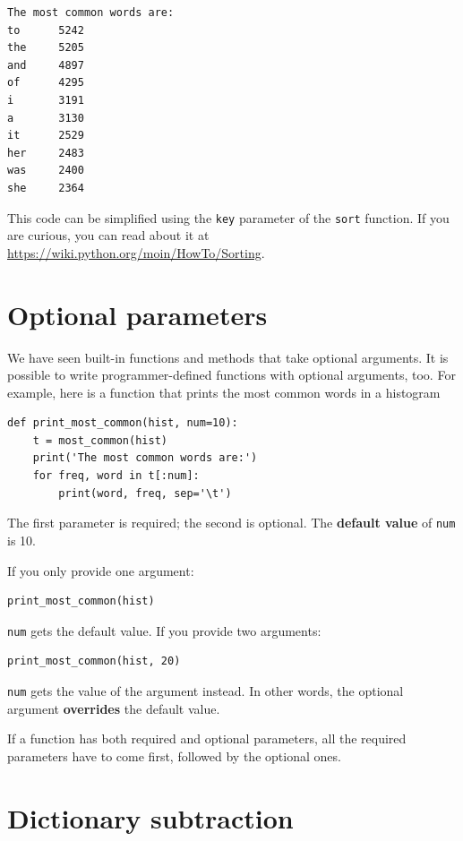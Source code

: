 \documentclass[10pt]{book}
\begin{document}
\begin{verbatim}
The most common words are:
to      5242
the     5205
and     4897
of      4295
i       3191
a       3130
it      2529
her     2483
was     2400
she     2364
\end{verbatim}
%
This code can be simplified using the {\tt key} parameter of
the {\tt sort} function.  If you are curious, you can read about it
at \url{https://wiki.python.org/moin/HowTo/Sorting}.


\section{Optional parameters}

We have seen built-in functions and methods that take optional
arguments.  It is possible to write programmer-defined functions
with optional arguments, too.  For example, here is a function that
prints the most common words in a histogram

\begin{verbatim}
def print_most_common(hist, num=10):
    t = most_common(hist)
    print('The most common words are:')
    for freq, word in t[:num]:
        print(word, freq, sep='\t')
\end{verbatim}

The first parameter is required; the second is optional.
The {\bf default value} of {\tt num} is 10.

If you only provide one argument:

\begin{verbatim}
print_most_common(hist)
\end{verbatim}

{\tt num} gets the default value.  If you provide two arguments:

\begin{verbatim}
print_most_common(hist, 20)
\end{verbatim}

{\tt num} gets the value of the argument instead.  In other
words, the optional argument {\bf overrides} the default value.

If a function has both required and optional parameters, all
the required parameters have to come first, followed by the
optional ones.


\section{Dictionary subtraction}
\label{dictsub}
\end{document}
